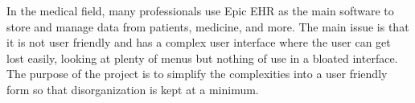 In the medical field, many professionals use Epic EHR as the main software to store and manage data from patients, medicine, and more. The main issue is that it is not user friendly and has a complex user interface where the user can get lost easily, looking at plenty of menus but nothing of use in a bloated interface. The purpose of the project is to simplify the complexities into a user friendly form so that disorganization is kept at a minimum.